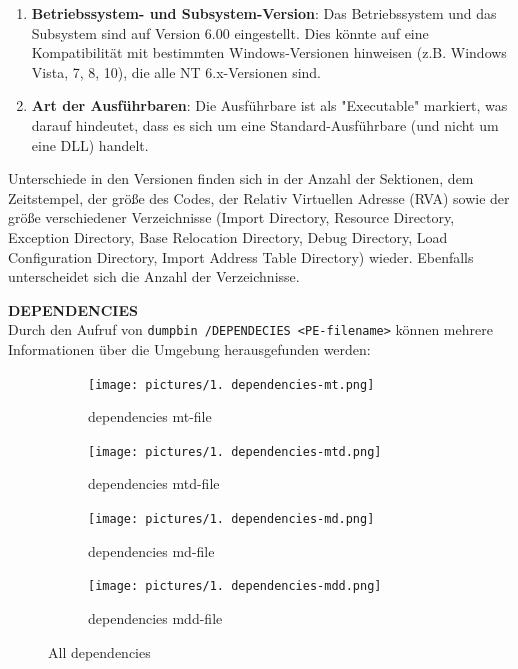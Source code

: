 \documentclass{article}
\begin{document}
\begin{enumerate}
\begin{enumerate}
\begin{enumerate}
				\item \textbf{Betriebssystem- und Subsystem-Version}: Das Betriebssystem und das Subsystem sind auf Version 6.00 eingestellt. Dies könnte auf eine Kompatibilität mit bestimmten Windows-Versionen hinweisen (z.B. Windows Vista, 7, 8, 10), die alle NT 6.x-Versionen sind.
				\item \textbf{Art der Ausführbaren}: Die Ausführbare ist als "Executable" markiert, was darauf hindeutet, dass es sich um eine Standard-Ausführbare (und nicht um eine DLL) handelt.
			\end{enumerate}
		\end{enumerate}
		Unterschiede in den Versionen finden sich in der Anzahl der Sektionen, dem Zeitstempel, der größe des Codes, der Relativ Virtuellen Adresse (RVA) sowie der größe verschiedener Verzeichnisse (Import Directory, Resource Directory, Exception Directory, Base Relocation Directory, Debug Directory, Load Configuration Directory, Import Address Table Directory)  wieder. Ebenfalls unterscheidet sich die Anzahl der Verzeichnisse.\\
		\pagebreak
		
		\noindent \textbf{DEPENDENCIES}\\
		Durch den Aufruf von \texttt{dumpbin /DEPENDECIES <PE-filename>} können mehrere Informationen über die Umgebung herausgefunden werden:\\
		\begin{figure}[htp]
			\centering
			\begin{subfigure}[b]{0.45\textwidth}
				\texttt{[image: pictures/1. dependencies-mt.png]}
				\caption{dependencies mt-file}
				\label{fig:image1}
			\end{subfigure}
			\hfill
			\begin{subfigure}[b]{0.45\textwidth}
				\texttt{[image: pictures/1. dependencies-mtd.png]}
				\caption{dependencies mtd-file}
				\label{fig:image2}
			\end{subfigure}
			
			\vspace{10pt} %
			
			\begin{subfigure}[b]{0.45\textwidth}
				\texttt{[image: pictures/1. dependencies-md.png]}
				\caption{dependencies md-file}
				\label{fig:image3}
			\end{subfigure}
			\hfill
			\begin{subfigure}[b]{0.45\textwidth}
				\texttt{[image: pictures/1. dependencies-mdd.png]}
				\caption{dependencies mdd-file}
				\label{fig:image4}
			\end{subfigure}
			\caption{All dependencies}
			\label{fig:grid}
		\end{figure}
		

\end{enumerate}
\end{document}
